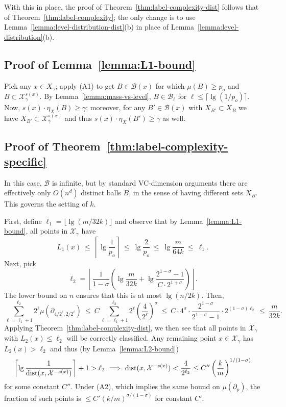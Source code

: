 \documentclass{article}
\def\X{{\mathcal X}}
\def\B{{\mathcal B}}
\def\dist{{\rm dist}}
\begin{document}
With this in place, the proof of Theorem~\ref{thm:label-complexity-dist} follows that of Theorem~\ref{thm:label-complexity}; the only change is to use Lemma~\ref{lemma:level-distribution-dist}(b) in place of Lemma~\ref{lemma:level-distribution}(b).

\subsection{Proof of Lemma~\ref{lemma:L1-bound}}

Pick any $x \in X_\gamma$; apply (A1) to get $B \in \B(x)$ for which $\mu(B) \geq p_o$ and $B \subset \X^{s(x)}_\gamma$. By Lemma~\ref{lemma:mass-vs-level}, $B \in \B_\ell$ for $\ell \leq \lceil \lg (1/p_o) \rceil$. Now, $s(x) \cdot \eta_X(B) \geq \gamma$; moreover, for any $B' \in \B(x)$ with $X_{B'} \subset X_B$ we have $X_{B'} \subset \X^{s(x)}_\gamma$ and thus $s(x) \cdot \eta_X(B') \geq \gamma$ as well.

\subsection{Proof of Theorem~\ref{thm:label-complexity-specific}}

In this case, $\B$ is infinite, but by standard VC-dimension arguments there are effectively only $O(n^d)$ distinct balls $B$, in the sense of having different sets $X_B$. This governs the setting of $k$.

First, define $\ell_1 = \lfloor \lg (m/32k) \rfloor$ and observe that by Lemma~\ref{lemma:L1-bound}, all points in $\X_\gamma$ have 
$$ L_1(x) 
\ \leq \ 
\left\lceil \lg \frac{1}{p_o} \right\rceil
\ \leq \ 
\lg \frac{2}{p_o} 
\ \leq \ 
\lg \frac{m}{64k}
\ \leq \ 
\ell_1 .
$$
Next, pick  
$$ \ell_2 = \left\lfloor \frac{1}{1-\sigma} \left( \lg \frac{m}{32k} + \lg \frac{2^{1-\sigma}-1}{C \cdot 2^{1+\sigma}} \right) \right\rfloor.$$
The lower bound on $n$ ensures that this is at most $\lg (n/2k)$. Then,
$$
\sum_{\ell = \ell_1+1}^{\ell_2} 2^\ell \mu(\partial_{4/2^\ell, 2/2^\ell})
\ \leq \ 
C \sum_{\ell = \ell_1+1}^{\ell_2} 2^\ell \left( \frac{4}{2^\ell} \right)^\sigma 
\ \leq \ 
C \cdot 4^\sigma \cdot \frac{2^{1-\sigma}}{2^{1-\sigma}-1} \cdot 2^{(1-\sigma)\ell_2}
\ \leq \ 
\frac{m}{32k} .
$$
Applying Theorem~\ref{thm:label-complexity-dist}, we then see that all points in $\X_\gamma$ with $L_2(x) \leq \ell_2$ will be correctly classified. Any remaining point $x \in \X_\gamma$ has $L_2(x) > \ell_2$ and thus (by Lemma~\ref{lemma:L2-bound})
$$ \left\lceil \lg \frac{1}{\dist(x, \X^{-s(x)})} \right\rceil + 1 > \ell_2 
\ \Longrightarrow \ 
\dist(x, \X^{-s(x)}) < \frac{4}{2^{\ell_2}} \leq C'' \left( \frac{k}{m} \right)^{1/(1-\sigma)} 
$$
for some constant $C''$. Under (A2), which implies the same bound on $\mu(\partial_p)$, the fraction of such points is $\leq C' (k/m)^{\sigma/(1-\sigma)}$ for constant $C'$.
\end{document}
